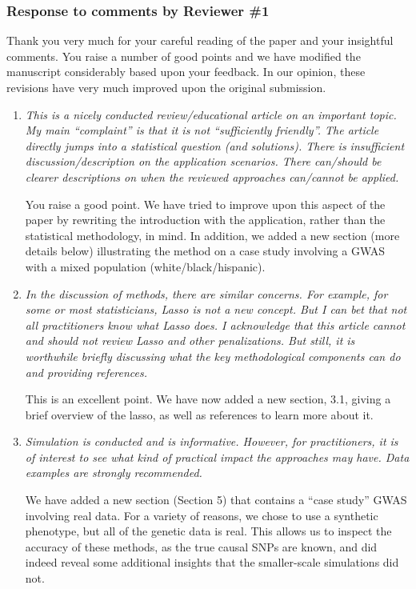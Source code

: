 \documentclass{article}
\begin{document}
\subsubsection*{Response to comments by Reviewer \#1}

Thank you very much for your careful reading of the paper and your insightful comments. You raise a number of good points and we have modified the manuscript considerably based upon your feedback.  In our opinion, these revisions have very much improved upon the original submission.

\begin{enumerate}

\item \emph{This is a nicely conducted review/educational article on an important topic. My main ``complaint'' is that it is not ``sufficiently friendly''.  The article directly jumps into a statistical question (and solutions). There is insufficient discussion/description on the application scenarios. There can/should be clearer descriptions on when the reviewed approaches can/cannot be applied.}

  You raise a good point.  We have tried to improve upon this aspect of the paper by rewriting the introduction with the application, rather than the statistical methodology, in mind.  In addition, we added a new section (more details below) illustrating the method on a case study involving a GWAS with a mixed population (white/black/hispanic).
  
\item \emph{In the discussion of methods, there are similar concerns. For example, for some or most statisticians, Lasso is not a new concept. But I can bet that not all practitioners know what Lasso does. I acknowledge that this article cannot and should not review Lasso and other penalizations. But still, it is worthwhile briefly discussing what the key methodological components can do and providing references.}

  This is an excellent point.  We have now added a new section, 3.1, giving a brief overview of the lasso, as well as references to learn more about it.

\item \emph{Simulation is conducted and is informative. However, for practitioners, it is of interest to see what kind of practical impact the approaches may have. Data examples are strongly recommended.}

  We have added a new section (Section 5) that contains a ``case study'' GWAS involving real data.  For a variety of reasons, we chose to use a synthetic phenotype, but all of the genetic data is real.  This allows us to inspect the accuracy of these methods, as the true causal SNPs are known, and did indeed reveal some additional insights that the smaller-scale simulations did not.


\end{enumerate}
\end{document}
